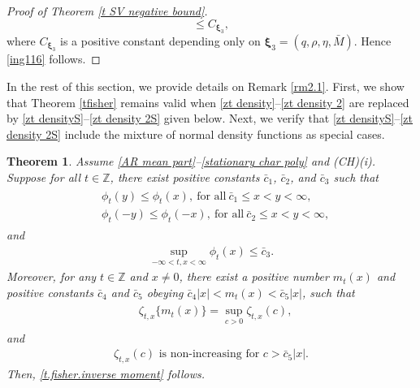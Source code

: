 \documentclass[ejsv2]{imsart}
\theoremstyle{plain}
\newtheorem{theorem}{Theorem}[section]
\theoremstyle{definition}
\theoremstyle{remark}
\begin{document}
\begin{appendix}
\begin{proof}[Proof of Theorem \ref{t SV negative bound}]
\begin{equation*}
  \leq C_{\bm{\xi}_3},
\end{equation*}
where $C_{\bm{\xi}_3}$ is a positive constant depending only on $\bm{\xi}_3=(q,\rho,\eta,\bar{M})$. 
Hence \eqref{ing116} follows.
\end{proof}

In the rest of this section, we provide details on Remark \ref{rm2.1}. First, we show that Theorem \ref{tfisher} remains valid when \eqref{zt density}--\eqref{zt density 2} are replaced by \eqref{zt densityS}--\eqref{zt density 2S} given below. Next, we verify that \eqref{zt densityS}--\eqref{zt density 2S} include the mixture of normal density functions as special cases.

\begin{theorem}\label{tfisherS}
{Assume \eqref{AR mean part}--\eqref{stationary char poly} and {\rm (CH)(i)}}. Suppose for all $t \in \mathbb{Z}$, there exist positive constants $\bar{c}_1$, $\bar{c}_2$, and $\bar{c}_3$ such that
\begin{align}\label{zt densityS}
\begin{split}
& \phi_t(y)\leq \phi_t(x),\ \textrm{for all}\  \bar{c}_1\leq x< y<\infty,\\
& \phi_t(-y)\leq \phi_{t}(-x),\ \textrm{for all}\  \bar{c}_2\leq x< y<\infty,
\end{split}
\end{align}
and
\begin{eqnarray}
\label{ing104S}
\sup_{-\infty<t,x<\infty}\phi_t(x)\leq \bar{c}_3.
\end{eqnarray}
Moreover, for any $t\in \mathbb{Z}$ and $x\neq0$, there exist a positive number $m_t(x)$ and positive constants $\bar{c}_4$ and $\bar{c}_5$ obeying $\bar{c}_4|x| < m_t(x)< \bar{c}_5|x|$, such that
\begin{align}
\begin{split}
\label{zt density 0S}
& \zeta_{t,x}\{m_t(x)\}=\sup_{c>0} \zeta_{t,x}(c),
\end{split}
\end{align}
and 
\begin{equation}
\label{zt density 2S}
\begin{split}
\zeta_{t,x}(c) \,\,\mbox{is non-increasing for} \,\,
c>\bar{c}_5|x|.
\end{split}
\end{equation}
Then,
\eqref{t.fisher.inverse moment} follows.
\end{theorem}


\end{appendix}
\end{document}
